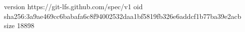 version https://git-lfs.github.com/spec/v1
oid sha256:3a9ae469cc6babafa6c8f94002532daa1bf5819fb326e6addcf1b77ba39e2acb
size 18898
